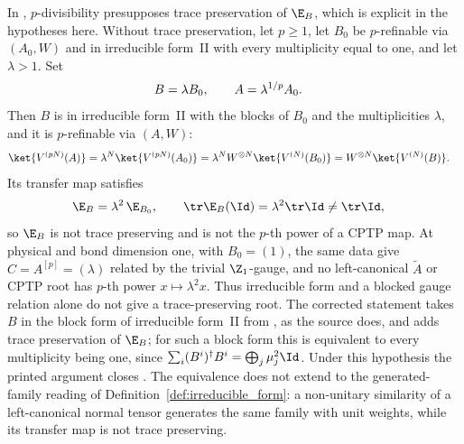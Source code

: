 \begin{remark}
    \label{rem:thm_4_1_forward_trace_preservation}
    In \cite[Theorem~4.1]{DeLasCuevas2017Irreducible}, $p$-divisibility presupposes
    trace preservation of $\E_B$, which is explicit in the hypotheses here.
    Without trace preservation, let $p \ge 1$, let $B_0$ be $p$-refinable via $(A_0, W)$ and in
    irreducible form~II with every multiplicity equal to one, and let
    $\lambda > 1$. Set
    \begin{align}
        B
         & = \lambda B_0,
        \qquad
        A = \lambda^{1/p} A_0.
        \notag
    \end{align}
    Then $B$ is in irreducible form~II with the blocks of $B_0$ and the
    multiplicities $\lambda$, and it is $p$-refinable via $(A, W)$:
    \begin{align}
        \ket{V^{(pN)}(A)}
         & = \lambda^{N}\ket{V^{(pN)}(A_0)}
        = \lambda^{N} W^{\otimes N}\ket{V^{(N)}(B_0)}
        = W^{\otimes N}\ket{V^{(N)}(B)}.
        \notag
    \end{align}
    Its transfer map satisfies
    \begin{align}
        \E_B
         & = \lambda^{2}\,\E_{B_0},
        \qquad
        \tr \E_B(\Id) = \lambda^{2}\tr \Id \neq \tr \Id,
        \notag
    \end{align}
    so $\E_B$ is not trace preserving and is not the $p$-th power of a CPTP
    map. At physical and bond dimension one, with $B_0 = (1)$, the same data
    give $C = A^{[p]} = (\lambda)$ related by the trivial $\Z_1$-gauge, and
    no left-canonical $\widetilde A$ or CPTP root has $p$-th power
    $x \mapsto \lambda^2 x$. Thus irreducible form and a blocked gauge
    relation alone do not give a trace-preserving root.
    The corrected statement takes $B$ in the block form of
    irreducible form~II from \cite{DeLasCuevas2017Irreducible}, as the source
    does, and adds trace preservation of $\E_B$; for such a block form this is
    equivalent to every multiplicity being one, since
    $\sum_i (B^i)^\dagger B^i = \bigoplus_j \mu_j^2 \Id$. Under this
    hypothesis the printed argument closes
    \cite{gap:dccsp17_thm41_forward_trace_preservation}. The equivalence does
    not extend to the generated-family reading of
    Definition~\ref{def:irreducible_form}: a non-unitary similarity of a
    left-canonical normal tensor generates the same family with unit weights,
    while its transfer map is not trace preserving.
\end{remark}

